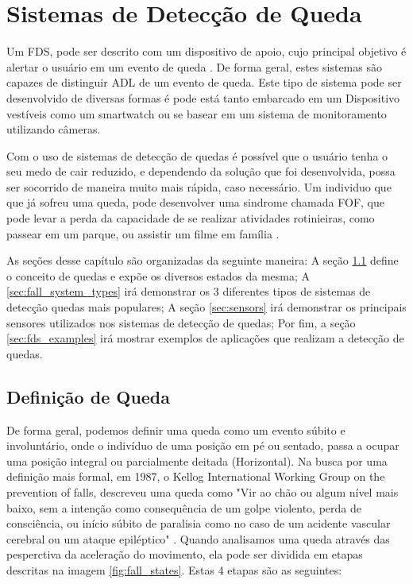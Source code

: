 \chapter{Sistemas de Detecção de Queda}
\label{cap:sistemasRecomendacao}

Um \ac{FDS}, pode ser descrito com um dispositivo de apoio, cujo principal objetivo é alertar o usuário em um evento de queda \citep{igual2013challenges}. De forma geral, estes sistemas são capazes de distinguir \ac{ADL}  de um evento de queda. Este tipo de sistema pode ser desenvolvido de diversas formas é pode está tanto embarcado em um Dispositivo vestíveis como um smartwatch ou se basear em um sistema de monitoramento utilizando câmeras. 

Com o uso de sistemas de detecção de quedas é possível que o usuário tenha o seu medo de cair reduzido, e dependendo da solução que foi desenvolvida, possa ser socorrido de maneira muito mais rápida, caso necessário. Um individuo que que já sofreu uma queda, pode desenvolver uma sindrome chamada \ac{FOF}, que pode levar a perda da capacidade de se realizar atividades rotinieiras, como passear em um parque, ou assistir um filme em família \citep{legters2002fear}.

As seções desse capítulo são organizadas da seguinte maneira: A seção \ref{sec:fall_definition} define o conceito de quedas e expõe os diversos estados da mesma; A \ref{sec:fall_system_types} irá demonstrar os 3 diferentes tipos de sistemas de detecção quedas mais populares; A seção \ref{sec:sensors} irá demonstrar os principais sensores utilizados nos sistemas de detecção de quedas; Por fim, a seção \ref{sec:fds_examples}  irá mostrar exemplos de aplicações que realizam a detecção de quedas. 



\section{Definição de Queda}
\label{sec:fall_definition}
De forma geral, podemos definir uma queda como um evento súbito e involuntário, onde o indivíduo de uma posição em pé ou sentado, passa a ocupar uma posição integral ou parcialmente deitada (Horizontal). Na busca por uma definição mais formal, em 1987, o Kellog International Working Group on the prevention of falls, descreveu uma queda como "Vir ao chão ou algum nível mais baixo, sem a intenção como consequência de um golpe violento, perda de consciência, ou início súbito de paralisia como no caso de um acidente vascular cerebral ou um ataque epiléptico"  \citep{igual2013challenges}. Quando analisamos uma queda através das pesperctiva da aceleração do movimento, ela pode ser dividida em etapas descritas na imagem \ref{fig:fall_states}. Estas 4 etapas são as seguintes:



